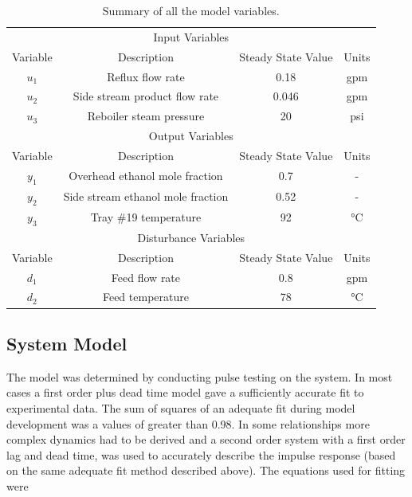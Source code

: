 \begin{table}[H]
	\centering
	\caption{Summary of all the model variables.}
	\begin{tabular}{cccc}
		\hline
		\multicolumn{4}{c}{Input Variables}                                       \\
		
		Variable & Description                       & Steady State Value & Units \\
		\hline
		$u_1$       & Reflux flow rate                  & 0.18               & gpm   \\
		$u_2$       & Side stream product flow rate     & 0.046              & gpm   \\
		$u_3$       & Reboiler steam pressure           & 20                 & psi   \\
		\hline
		\multicolumn{4}{c}{Output Variables}                                      \\
		
		Variable & Description                       & Steady State Value & Units \\
		\hline
		$y_1$       & Overhead ethanol mole fraction    & 0.7                & -     \\
		$y_2$       & Side stream ethanol mole fraction & 0.52               & -     \\
		$y_3$       & Tray \#19 temperature             & 92                 & \si{\celsius} \\
		\hline
		\multicolumn{4}{c}{Disturbance Variables}                                 \\
		
		Variable & Description                       & Steady State Value & Units \\
		\hline
		$d_1$       & Feed flow rate                    & 0.8                & gpm   \\
		$d_2$       & Feed temperature                  & 78                 & \si{\celsius} \\\hline
	\end{tabular}
	\label{tab:Variables}
\end{table}


\subsection{System Model}

The model was determined by conducting pulse testing on the system. In most cases a first order plus dead time model gave a sufficiently accurate fit to experimental data. The sum of squares of an adequate fit during model development was a values of greater than 0.98. In some relationships more complex dynamics had to be derived and a second order system with a first order lag and dead time, was used to accurately describe the impulse response (based on the same adequate fit method described above). The equations used for fitting were

